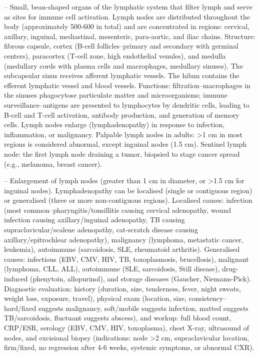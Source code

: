-- Small, bean-shaped organs of the lymphatic system that filter lymph and serve as sites for immune cell activation. Lymph nodes are distributed throughout the body (approximately 500-600 in total) and are concentrated in regions: cervical, axillary, inguinal, mediastinal, mesenteric, para-aortic, and iliac chains. Structure: fibrous capsule, cortex (B-cell follicles--primary and secondary with germinal centers), paracortex (T-cell zone, high endothelial venules), and medulla (medullary cords with plasma cells and macrophages, medullary sinuses). The subcapsular sinus receives afferent lymphatic vessels. The hilum contains the efferent lymphatic vessel and blood vessels. Functions: filtration--macrophages in the sinuses phagocytose particulate matter and microorganisms; immune surveillance--antigens are presented to lymphocytes by dendritic cells, leading to B-cell and T-cell activation, antibody production, and generation of memory cells. Lymph nodes enlarge (lymphadenopathy) in response to infection, inflammation, or malignancy. Palpable lymph nodes in adults: >1 cm in most regions is considered abnormal, except inguinal nodes (1.5 cm). Sentinel lymph node: the first lymph node draining a tumor, biopsied to stage cancer spread (e.g., melanoma, breast cancer).

-- Enlargement of lymph nodes (greater than 1 cm in diameter, or >1.5 cm for inguinal nodes). Lymphadenopathy can be localised (single or contiguous region) or generalised (three or more non-contiguous regions). Localised causes: infection (most common--pharyngitis/tonsillitis causing cervical adenopathy, wound infection causing axillary/inguinal adenopathy, TB causing supraclavicular/scalene adenopathy, cat-scratch disease causing axillary/epitrochlear adenopathy), malignancy (lymphoma, metastatic cancer, leukemia), autoimmune (sarcoidosis, SLE, rheumatoid arthritis). Generalised causes: infectious (EBV, CMV, HIV, TB, toxoplasmosis, brucellosis), malignant (lymphoma, CLL, ALL), autoimmune (SLE, sarcoidosis, Still disease), drug-induced (phenytoin, allopurinol), and storage diseases (Gaucher, Niemann-Pick). Diagnostic evaluation: history (duration, size, tenderness, fever, night sweats, weight loss, exposure, travel), physical exam (location, size, consistency--hard/fixed suggests malignancy, soft/mobile suggests infection, matted suggests TB/sarcoidosis, fluctuant suggests abscess), and workup: full blood count, CRP/ESR, serology (EBV, CMV, HIV, toxoplasma), chest X-ray, ultrasound of nodes, and excisional biopsy (indications: node >2 cm, supraclavicular location, firm/fixed, no regression after 4-6 weeks, systemic symptoms, or abnormal CXR).

